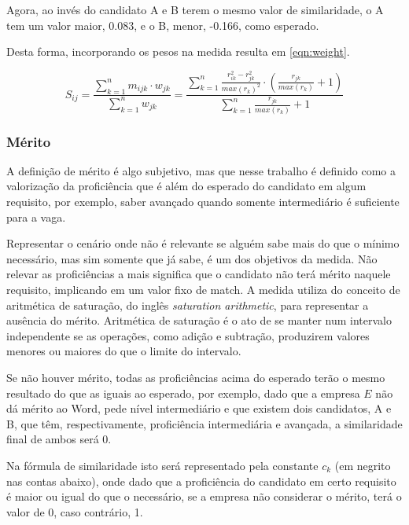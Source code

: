 \documentclass[preprint,12pt]{elsarticle}
\begin{document}
Agora, ao invés do candidato A e B terem o mesmo valor de similaridade, o A tem um valor maior, 0.083, e o B, menor, -0.166, como esperado.

Desta forma, incorporando os pesos na medida resulta em \ref{eqn:weight}. 

\begin{equation}
\label{eqn:weighted-sim}
S_{ij} = \frac{\sum_{k=1}^n m_{ijk} \cdot w_{jk}}
              {\sum_{k=1}^n w_{jk}} = 
         \frac{\sum_{k=1}^n \frac{r_{ik}^2 - r_{jk}^2}{max(r_k)^2} \cdot (\frac{r_{jk}}{max(r_k)} + 1)}
              {\sum_{k=1}^n {\frac{r_{jk}}{max(r_k)} + 1}}
\end{equation}

\subsubsection{Mérito}
\label{sssec:merit}

A definição de mérito é algo subjetivo, mas que nesse trabalho é definido como a valorização da proficiência que é além do esperado do candidato em algum requisito, por exemplo, saber avançado quando somente intermediário é suficiente para a vaga. 

Representar o cenário onde não é relevante se alguém sabe mais do que o mínimo necessário, mas sim somente que já sabe, é um dos objetivos da medida. Não relevar as proficiências a mais significa que o candidato não terá mérito naquele requisito, implicando em um valor fixo de match. A medida utiliza do conceito de  aritmética de saturação, do inglês \textit{saturation arithmetic}, para representar a ausência do mérito. Aritmética de saturação é o ato de se manter num intervalo independente se as operações, como adição e subtração, produzirem valores menores ou maiores do que o limite do intervalo.

Se não houver mérito, todas as proficiências acima do esperado terão o mesmo resultado do que as iguais ao esperado, por exemplo, dado que a empresa $E$ não dá mérito ao Word, pede nível intermediário e que existem dois candidatos, A e B, que têm, respectivamente, proficiência intermediária e avançada, a similaridade final de ambos será 0.

Na fórmula de similaridade isto será representado pela constante $c_{k}$ (em negrito nas contas abaixo), onde dado que a proficiência do candidato em certo requisito é maior ou igual do que o necessário, se a empresa não considerar o mérito, terá o valor de 0, caso contrário, 1.
\end{document}
